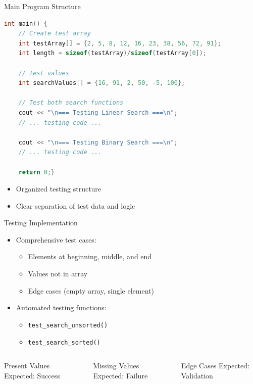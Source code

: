 \documentclass{beamer}
\begin{document}
\begin{frame}[fragile]{Main Program Structure}
\begin{lstlisting}[language=C++, basicstyle=\small]
int main() {
    // Create test array
    int testArray[] = {2, 5, 8, 12, 16, 23, 38, 56, 72, 91};
    int length = sizeof(testArray)/sizeof(testArray[0]);
    
    // Test values
    int searchValues[] = {16, 91, 2, 50, -5, 100};
    
    // Test both search functions
    cout << "\n=== Testing Linear Search ===\n";
    // ... testing code ...
    
    cout << "\n=== Testing Binary Search ===\n";
    // ... testing code ...
    
    return 0;}
\end{lstlisting}


\begin{itemize}
\item Organized testing structure
\item Clear separation of test data and logic
\end{itemize}
\end{frame}

\begin{frame}{Testing Implementation}
\begin{itemize}
\item Comprehensive test cases:
  \begin{itemize}
  \item Elements at beginning, middle, and end
  \item Values not in array
  \item Edge cases (empty array, single element)
  \end{itemize}
\item Automated testing functions:
  \begin{itemize}
  \item \texttt{test\_search\_unsorted()}
  \item \texttt{test\_search\_sorted()}
  \end{itemize}
\end{itemize}

\begin{columns}[t]
\begin{block}{Present Values}
Expected: Success
\end{block}

\begin{block}{Missing Values}
Expected: Failure
\end{block}

\begin{block}{Edge Cases}
Expected: Validation
\end{block}
\end{columns}
\end{frame}
\end{document}
